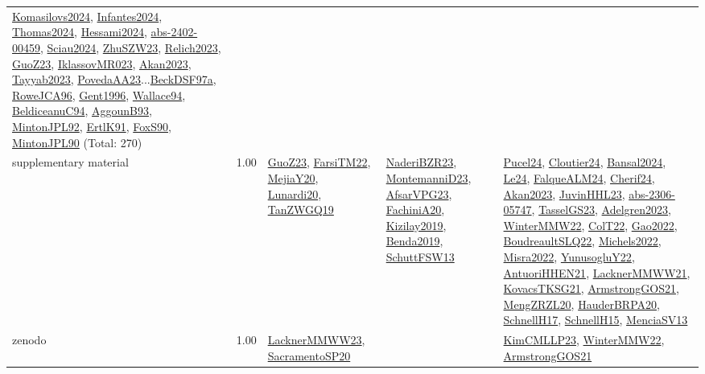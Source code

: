 {\begin{longtable}{p{3cm}r>{\raggedright\arraybackslash}p{6cm}>{\raggedright\arraybackslash}p{6cm}>{\raggedright\arraybackslash}p{8cm}}
\hyperref[detail:Komasilovs2024]{Komasilovs2024}, \hyperref[detail:Infantes2024]{Infantes2024}, \hyperref[detail:Thomas2024]{Thomas2024}, \hyperref[detail:Hessami2024]{Hessami2024}, \hyperref[detail:abs-2402-00459]{abs-2402-00459}, \hyperref[detail:Sciau2024]{Sciau2024}, \hyperref[detail:ZhuSZW23]{ZhuSZW23}, \hyperref[detail:Relich2023]{Relich2023}, \hyperref[detail:GuoZ23]{GuoZ23}, \hyperref[detail:IklassovMR023]{IklassovMR023}, \hyperref[detail:Akan2023]{Akan2023}, \hyperref[detail:Tayyab2023]{Tayyab2023}, \hyperref[detail:PovedaAA23]{PovedaAA23}...\hyperref[detail:BeckDSF97a]{BeckDSF97a}, \hyperref[detail:RoweJCA96]{RoweJCA96}, \hyperref[detail:Gent1996]{Gent1996}, \hyperref[detail:Wallace94]{Wallace94}, \hyperref[detail:BeldiceanuC94]{BeldiceanuC94}, \hyperref[detail:AggounB93]{AggounB93}, \hyperref[detail:MintonJPL92]{MintonJPL92}, \hyperref[detail:ErtlK91]{ErtlK91}, \hyperref[detail:FoxS90]{FoxS90}, \hyperref[detail:MintonJPL90]{MintonJPL90} (Total: 270)\\
\index{supplementary material}\index{Benchmarks!supplementary material}supplementary material &  1.00 & \hyperref[detail:GuoZ23]{GuoZ23}, \hyperref[detail:FarsiTM22]{FarsiTM22}, \hyperref[detail:MejiaY20]{MejiaY20}, \hyperref[detail:Lunardi20]{Lunardi20}, \hyperref[detail:TanZWGQ19]{TanZWGQ19} & \hyperref[detail:NaderiBZR23]{NaderiBZR23}, \hyperref[detail:MontemanniD23]{MontemanniD23}, \hyperref[detail:AfsarVPG23]{AfsarVPG23}, \hyperref[detail:FachiniA20]{FachiniA20}, \hyperref[detail:Kizilay2019]{Kizilay2019}, \hyperref[detail:Benda2019]{Benda2019}, \hyperref[detail:SchuttFSW13]{SchuttFSW13} & \hyperref[detail:Pucel24]{Pucel24}, \hyperref[detail:Cloutier24]{Cloutier24}, \hyperref[detail:Bansal2024]{Bansal2024}, \hyperref[detail:Le24]{Le24}, \hyperref[detail:FalqueALM24]{FalqueALM24}, \hyperref[detail:Cherif24]{Cherif24}, \hyperref[detail:Akan2023]{Akan2023}, \hyperref[detail:JuvinHHL23]{JuvinHHL23}, \hyperref[detail:abs-2306-05747]{abs-2306-05747}, \hyperref[detail:TasselGS23]{TasselGS23}, \hyperref[detail:Adelgren2023]{Adelgren2023}, \hyperref[detail:WinterMMW22]{WinterMMW22}, \hyperref[detail:ColT22]{ColT22}, \hyperref[detail:Gao2022]{Gao2022}, \hyperref[detail:BoudreaultSLQ22]{BoudreaultSLQ22}, \hyperref[detail:Michels2022]{Michels2022}, \hyperref[detail:Misra2022]{Misra2022}, \hyperref[detail:YunusogluY22]{YunusogluY22}, \hyperref[detail:AntuoriHHEN21]{AntuoriHHEN21}, \hyperref[detail:LacknerMMWW21]{LacknerMMWW21}, \hyperref[detail:KovacsTKSG21]{KovacsTKSG21}, \hyperref[detail:ArmstrongGOS21]{ArmstrongGOS21}, \hyperref[detail:MengZRZL20]{MengZRZL20}, \hyperref[detail:HauderBRPA20]{HauderBRPA20}, \hyperref[detail:SchnellH17]{SchnellH17}, \hyperref[detail:SchnellH15]{SchnellH15}, \hyperref[detail:MenciaSV13]{MenciaSV13}\\
\index{zenodo}\index{Benchmarks!zenodo}zenodo &  1.00 & \hyperref[detail:LacknerMMWW23]{LacknerMMWW23}, \hyperref[detail:SacramentoSP20]{SacramentoSP20} &  & \hyperref[detail:KimCMLLP23]{KimCMLLP23}, \hyperref[detail:WinterMMW22]{WinterMMW22}, \hyperref[detail:ArmstrongGOS21]{ArmstrongGOS21}\\
\end{longtable}
}

